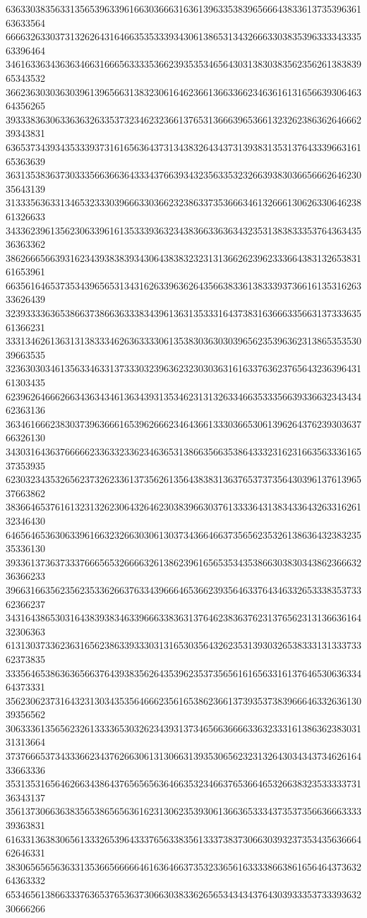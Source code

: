 63633038356331356539633961663036663163613963353839656664383361373539636163633564
66663263303731326264316466353533393430613865313432666330383539633334333563396464
34616336343636346631666563333536623935353465643031383038356235626138383965343532
36623630303630396139656631383230616462366136633662346361613165663930646364356265
39333836306336363263353732346232366137653136663965366132326238636264666239343831
63653734393435333937316165636437313438326434373139383135313764333966316165363639
36313538363730333566366364333437663934323563353232663938303665666264623035643139
31333563633134653233303966633036623238633735366634613266613062633064623861326633
34336239613562306339616135333936323438366336363432353138383335376436343536363362
38626665663931623439383839343064383832323131366262396233366438313265383161653961
66356164653735343965653134316263396362643566383361383339373661613531626333626439
32393333636538663738663633383439613631353331643738316366633566313733363561366231
33313462613631313833346263633330613538303630303965623539636231386535353039663535
32363030346135633463313733303239636232303036316163376362376564323639643161303435
62396264666266343634346136343931353462313132633466353335663933663234343462363136
36346166623830373963666165396266623464366133303665306139626437623930363766326130
34303164363766666233633233623463653138663566353864333231623166356333616537353935
62303234353265623732623361373562613564383831363765373735643039613761396537663862
38366465376161323132623064326462303839663037613333643138343364326331626132346430
64656465363063396166323266303061303734366466373565623532613863643238323535336130
39336137363733376665653266663261386239616565353435386630383034386236663236366233
39663166356235623533626637633439666465366239356463376434633265333835373362366237
34316438653031643839383463396663383631376462383637623137656231313663616432306363
61313037336236316562386339333031316530356432623531393032653833313133373362373835
33356465386363656637643938356264353962353735656161656331613764653063633464373331
35623062373164323130343535646662356165386236613739353738396664633263613039356562
30633361356562326133336530326234393137346566366663363233316138636238303131313664
37376665373433366234376266306131306631393530656232313264303434373462616433663336
35313531656462663438643765656563646635323466376536646532663832353333373136343137
35613730663638356538656563616231306235393061366365333437353735663666333339363831
61633136383065613332653964333765633835613337383730663039323735343563666462646331
38306565656363313536656666646163646637353233656163333866386165646437363264363332
65346561386633376365376536373066303833626565343434376430393335373339363230666266
